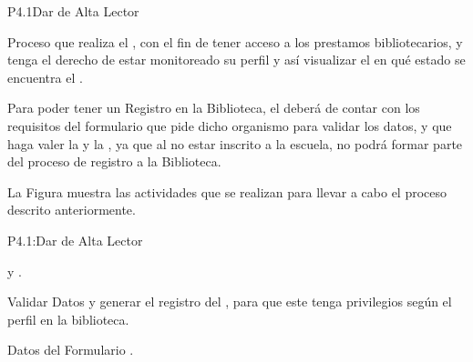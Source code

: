 




\begin{Proceso}{P4.1}{Dar de Alta Lector} {
  

Proceso que realiza el , con el fin de tener acceso a los prestamos bibliotecarios, y tenga el derecho de estar monitoreado su perfil y así visualizar el  en qué estado se encuentra el .
  
  
Para poder tener un Registro en la Biblioteca, el  deberá de contar con los requisitos del formulario que pide dicho organismo para validar los datos, y que haga valer la   y la , ya que al no estar inscrito a la escuela, no podrá formar parte del proceso de registro a la Biblioteca.
  



  \noindent La Figura  muestra las actividades que se realizan para llevar a cabo el proceso descrito anteriormente.


} {P4.1:Dar de Alta Lector}


   { %
     y .
  }

   { %
    Validar Datos y generar el registro del , para que este tenga privilegios según el perfil en la biblioteca.
  }

   { %
  	\begin{UClist}
  		\UCli Datos del Formulario .
    \end {UClist}
  }
  

\end{Proceso}

